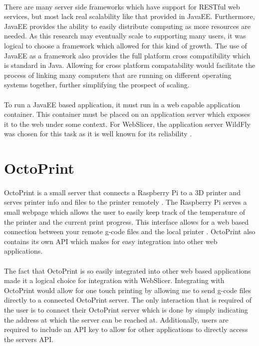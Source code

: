 \paragraph{}
There are many server side frameworks which have support for RESTful web services, but most lack real scalability like that provided in JavaEE.
Furthermore, JavaEE provides the ability to easily distribute computing as more resources are needed.
As this research may eventually scale to supporting many users, it was logical to choose a framework which allowed for this kind of growth.
The use of JavaEE as a framework also provides the full platform cross compatibility which is standard in Java.
Allowing for cross platform compatability would facilitate the process of linking many computers that are running on different operating systems together, further simplifying the prospect of scaling.

\paragraph{}
To run a JavaEE based application, it must run in a web capable application container.
This container must be placed on an application server which exposes it to the web under some context.
For WebSlicer, the application server WildFly was chosen for this task as it is well known for its reliability \citep{wildfly-2016}.

\section{OctoPrint}
\paragraph{}
OctoPrint is a small server that connects a Raspberry Pi to a 3D printer and serves printer info and files to the printer remotely \citep{octoprint-2016}.
The Raspberry Pi serves a small webpage which allows the user to easily keep track of the temperature of the printer and the current print progress.
This interface allows for a web based connection between your remote g-code files and the local printer \citep{mastering3Dprinting}.
OctoPrint also contains its own API which makes for easy integration into other web applications.

\paragraph{}
The fact that OctoPrint is so easily integrated into other web based applications made it a logical choice for integration with WebSlicer.
Integrating with OctoPrint would allow for one touch printing by allowing me to send g-code files directly to a connected OctoPrint server.
The only interaction that is required of the user is to connect their OctoPrint server which is done by simply indicating the address at which the server can be reached at.
Additionally, users are required to include an API key to allow for other applications to directly access the servers API.
 
